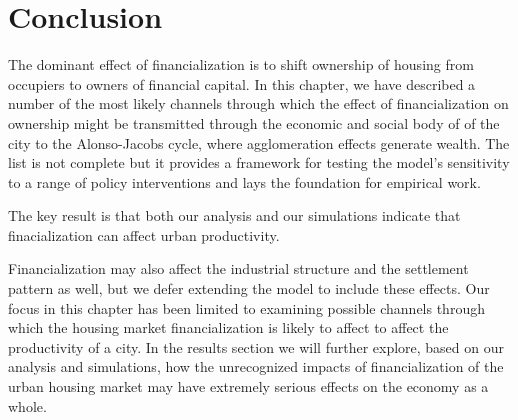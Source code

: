 \section{Conclusion}
 The dominant effect of financialization is to shift ownership of housing from occupiers to owners of financial capital. In this chapter, we have described a number of the most likely channels through which the effect of financialization on ownership  might be transmitted through the economic and social body of of the city to the Alonso-Jacobs cycle, where agglomeration effects generate wealth. The list is not complete but it provides a framework for testing the model's sensitivity to a range of policy interventions and lays the foundation for empirical work.  

The key result is that both our analysis and our simulations indicate that finacialization   can affect urban productivity. 

Financialization may also affect the industrial structure and the settlement pattern as well, but we defer extending the model to include these effects. Our focus in this chapter has been limited to examining possible channels through which the housing market financialization is likely to affect to affect the productivity of a city. In the results section we will further explore, based on our analysis and simulations, how the unrecognized impacts of financialization of the urban housing market may have extremely serious effects on the economy as a whole.








